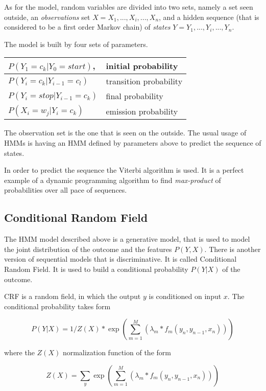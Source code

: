 As for the model, random variables are divided into two sets, namely a set seen outside, an \textit{observations} set $X=X_1,...,X_i,...,X_n$, and a hidden sequence (that is considered to be a first order Markov chain) of \textit{states} $Y=Y_1,...,Y_i,...,Y_n$.

The model is built by four sets of parameters. 

\begin{center}
	\centering
	\begin{tabular}{| l | l  |}	
		\hline
		$P(Y_1 = c_k | Y_0 = start) $, & initial probability \\
		\hline
		$P(Y_i = c_k | Y_{i-1} = c_l) $ & transition probability \\
		\hline
		$P(Y_i = stop | Y_{i-1} = c_k) $ & final probability \\
		\hline
		$P(X_i = w_j | Y_{i} = c_k) $ & emission probability \\
		\hline
	\end{tabular}
\end{center}

The observation set is the one that is seen on the outside. The usual usage of HMMs is having an HMM defined by parameters above to predict the sequence of states.

In order to predict the sequence the Viterbi algorithm is used. It is a perfect example of a dynamic programming algorithm to find \textit{max-product} of probabilities over all pace of sequences.

\subsection{Conditional Random Field}

The HMM model described above is a generative model, that is used to model the joint distribution of the outcome and the features $P(Y,X)$. There is another version of sequential models that is discriminative. It is called Conditional Random Field. It is used to build a conditional probability $P(Y|X)$ of the outcome.

CRF is a random field, in which the output $y$ is conditioned on input $x$. The conditional probability takes form

\[P(Y|X)=1/Z(X) * \exp(\sum_{m=1}^{M}{(\lambda_m * f_m (y_n, y_{n-1}, x_n))})\]

where the $Z(X)$ normalization function of the form 

\[Z(X)=\sum_{y}{\exp(\sum_{m=1}^{M}{(\lambda_m * f_m (y_n, y_{n-1}, x_n))})}\]

